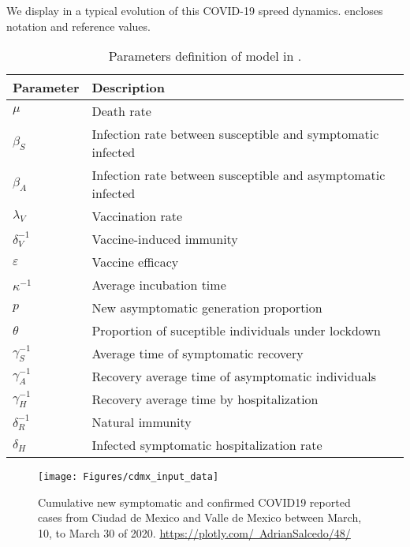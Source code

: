     We display in  a typical evolution of this COVID-19 spreed dynamics.
 encloses notation and reference values.
%
\begin{table*}[h!]
	\centering
	\begin{tabular}{>{\centering}%
        p{}%
        p{}
    }
    \toprule
		\textbf{Parameter} & \textbf{Description}
  	\\
  	\midrule
		$\mu$ &
			Death rate
		\\
        $\beta_S$ &
        	Infection rate between susceptible and symptomatic infected
		\\
        $\beta_A$ &
        	Infection rate between susceptible and asymptomatic infected
		\\
        $\lambda_V$ &
        	Vaccination rate
		\\
        $\delta_{V}^{-1}$ &
        Vaccine-induced immunity
		\\
        $\varepsilon$ &
        	Vaccine efficacy
		\\
        $\kappa^{-1}$ &
        	Average incubation time
        \\
		$p$ &
			New asymptomatic generation proportion
		\\
	    $\theta$ &
        	Proportion of suceptible individuals under lockdown
        \\
        $\gamma_{S}^{-1}$ &
        	Average time of symptomatic recovery
        \\
		$\gamma_{A}^{-1}$ &
			Recovery average time of asymptomatic individuals
		\\
		$\gamma_{H}^{-1}$ &
			Recovery average time by hospitalization
		\\
        $\delta_{R}^{-1}$ &
        	Natural immunity
  		\\
  		$\delta_{H}$ &
        	Infected symptomatic hospitalization rate
  		\\
  	\bottomrule
	\end{tabular}
		\caption{
			Parameters definition of model in
			.}
    \label{tbl:dynamics_base_parameters}
\end{table*}
%
\begin{figure*}[htb]
    \centering
    \texttt{[image: Figures/cdmx\_input\_data]}
    \caption{%
        Cumulative new symptomatic and confirmed COVID19 reported cases from
        Ciudad de Mexico and Valle de Mexico
        \cite{cdmxDATA} between March, 10, to March 30 of
        2020.
        \href{https://plotly.com/~AdrianSalcedo/48/}{%
		https://plotly.com/~AdrianSalcedo/48/}
	}
    \label{fig:data_CDMX}
\end{figure*}
%
